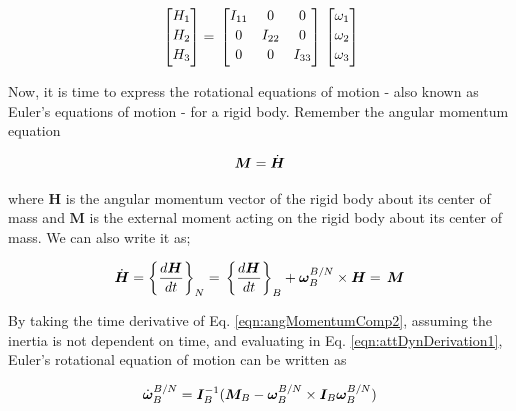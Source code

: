 \begin{equation}{\label{eqn:angularMomentumInPrincipleAxes}}
\begin{bmatrix}
H_1\\[0.2em]
H_2\\[0.2em]
H_3\\[0.2em]
\end{bmatrix}
 =\,
\begin{bmatrix}
I_{11} & 0 & 0 \\[0.2em]
0 & I_{22} & 0 \\[0.2em]
0 & 0 &I_{33} \\[0.2em]
\end{bmatrix}
\,
\begin{bmatrix}
\omega_1\\[0.2em]
\omega_2\\[0.2em]
\omega_3\\[0.2em]
\end{bmatrix}
\end{equation}

Now, it is time to express the rotational equations of motion - also  known as Euler's equations of motion - for a rigid body.  Remember the angular momentum equation

\begin{equation}{\label{eqn:angMomentumComp}}
\bm{M} = \dot{\bm{H}} 
\end{equation}

where $\bm{H}$ is the angular momentum vector of the rigid body about its center of mass and  $\bm{M}$ is the external moment acting on the rigid body about its center of mass.  We can also write it as;

\begin{equation}{\label{eqn:attDynDerivation1}}
\dot{\bm{H}} = \bigg\{ \frac{d\bm{H}}{dt} \bigg\}_N 
=\,
\bigg\{ \frac{d\bm{H}}{dt} \bigg\}_B  + \bm{\omega}_B^{B/N} \times \bm{H}
 =\,
  \bm{M}
\end{equation}

By taking the time derivative of Eq. \ref{eqn:angMomentumComp2}, assuming the inertia is not dependent on time, and evaluating in  Eq. \ref{eqn:attDynDerivation1}, Euler's rotational equation of motion can be written as 

\begin{equation}{\label{eqn:kinematicEquDQM}}
\dot{\bm{\omega}}_B^{B/N}  = \bm{I}_B^{-1} (\bm{M}_B - \bm{\omega}_B^{B/N} \times \bm{I}_B \bm{\omega}_B^{B/N}) 
\end{equation}

